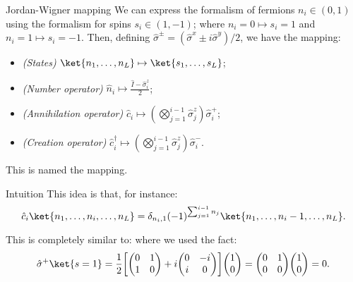 \documentclass[a4paper]{article}
\begin{document}
\begin{parag}{Jordan-Wigner mapping}
    We can express the formalism of fermions $n_i \in \left(0, 1\right)$ using the formalism for spins $s_i \in \left(1, -1\right)$; where $n_i=0 \mapsto s_i = 1$ and $n_i=1 \mapsto s_i = -1$. Then, defining $\hat{\sigma}^{\pm} = \left(\hat{\sigma}^x \pm i\hat{\sigma}^y\right)/2$, we have the mapping:
    \begin{itemize}
        \item \textit{(States)} $\displaystyle \ket{n_1, \ldots, n_L} \mapsto \ket{s_1, \ldots, s_L}$;
        \item \textit{(Number operator)} $\displaystyle \hat{n}_i \mapsto \frac{\hat{I} - \hat{\sigma}_i^z}{2}$;
        \item \textit{(Annihilation operator)} $\displaystyle \hat{c}_i \mapsto \left(\bigotimes_{j=1}^{i-1} \hat{\sigma}_j^z\right) \hat{\sigma}_i^+$;
        \item \textit{(Creation operator)} $\displaystyle \hat{c}_i^{\dagger} \mapsto \left(\bigotimes_{j=1}^{i-1} \hat{\sigma}_j^z\right) \hat{\sigma}_i^-$.
    \end{itemize}

    This is named the  mapping.

    \begin{subparag}{Intuition}
        This idea is that, for instance:
        \[\hat{c}_i \ket{n_1, \ldots, n_i, \ldots, n_L} = \delta_{n_i, 1} \left(-1\right)^{\sum_{j=1}^{i-1} n_j} \ket{n_1, \ldots, n_i-1, \ldots, n_L}.\]

        This is completely similar to:
        where we used the fact: 
        \[\hat{\sigma}^+ \ket{s = 1} = \frac{1}{2}\left[\begin{pmatrix} 0 & 1 \\ 1 & 0 \end{pmatrix} + i \begin{pmatrix} 0 & -i \\ i & 0 \end{pmatrix} \right] \begin{pmatrix} 1 \\ 0 \end{pmatrix} = \begin{pmatrix} 0 & 1 \\ 0 & 0 \end{pmatrix} \begin{pmatrix} 1 \\ 0 \end{pmatrix} = 0.\]
    \end{subparag}


\end{parag}
\end{document}
